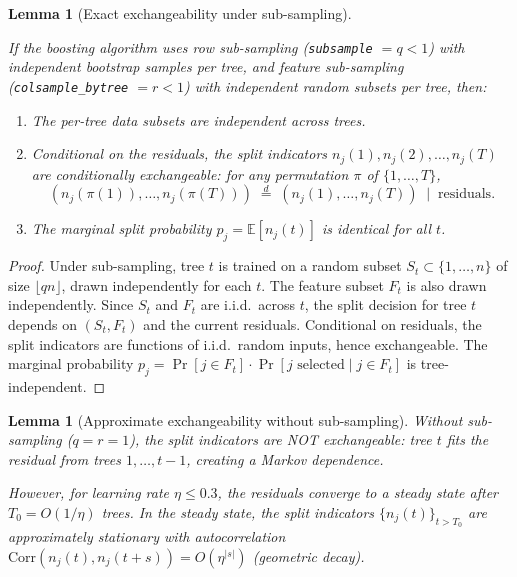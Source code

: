 \documentclass{article}
\newtheorem{lemma}[theorem]{Lemma}
\newcommand{\E}{\mathbb{E}}
\begin{document}
\begin{lemma}[Exact exchangeability under sub-sampling]
\label{lem:exchange-subsample}
\begin{sloppypar}
If the boosting algorithm uses row sub-sampling (\texttt{subsample} $= q < 1$) with
independent bootstrap samples per tree, and feature sub-sampling
(\texttt{colsample\_bytree} $= r < 1$) with independent random subsets per tree,
then:
\end{sloppypar}
\begin{enumerate}
    \item The per-tree data subsets are independent across trees.
    \item Conditional on the residuals, the split indicators $n_j(1), n_j(2), \ldots, n_j(T)$ are \emph{conditionally exchangeable}: for any permutation $\pi$ of $\{1, \ldots, T\}$,
    \[
        (n_j(\pi(1)), \ldots, n_j(\pi(T))) \;\overset{d}{=}\;
        (n_j(1), \ldots, n_j(T)) \;\mid\; \text{residuals}.
    \]
    \item The marginal split probability $p_j = \E[n_j(t)]$ is identical for all $t$.
\end{enumerate}
\end{lemma}

\begin{proof}
Under sub-sampling, tree $t$ is trained on a random subset $S_t \subset \{1, \ldots, n\}$ of size $\lfloor qn \rfloor$, drawn independently for each $t$. The feature subset $F_t$ is also drawn independently. Since $S_t$ and $F_t$ are i.i.d.\ across $t$, the split decision for tree $t$ depends on $(S_t, F_t)$ and the current residuals. Conditional on residuals, the split indicators are functions of i.i.d.\ random inputs, hence exchangeable. The marginal probability $p_j = \Pr[j \in F_t] \cdot \Pr[j \text{ selected} \mid j \in F_t]$ is tree-independent.
\end{proof}

\begin{lemma}[Approximate exchangeability without sub-sampling]
\label{lem:exchange-no-subsample}
Without sub-sampling ($q = r = 1$), the split indicators are NOT exchangeable: tree $t$ fits the residual from trees $1, \ldots, t-1$, creating a Markov dependence.

However, for learning rate $\eta \leq 0.3$, the residuals converge to a \emph{steady state} after $T_0 = O(1/\eta)$ trees. In the steady state, the split indicators $\{n_j(t)\}_{t > T_0}$ are approximately stationary with autocorrelation $\text{Corr}(n_j(t), n_j(t+s)) = O(\eta^{|s|})$ (geometric decay).
\end{lemma}
\end{document}
